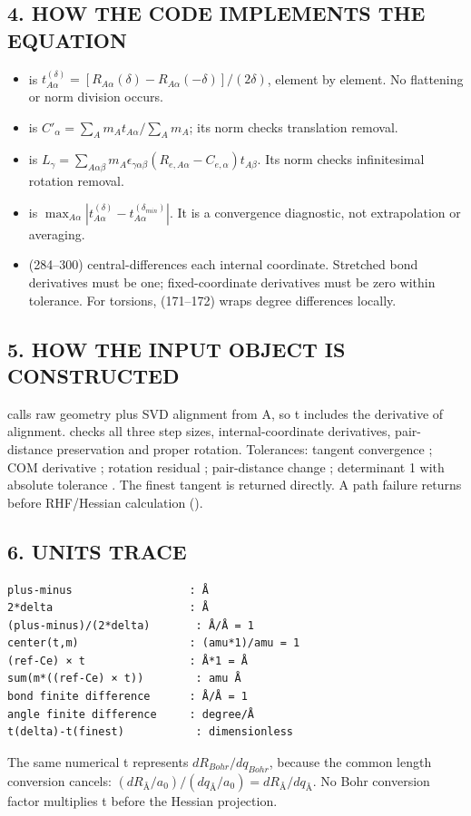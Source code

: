 \documentclass[10pt,a4paper]{article}
\begin{document}
\subsection{4. HOW THE CODE IMPLEMENTS THE EQUATION}
\begin{itemize}
\item {} is \(t^{(δ)}_{A\alpha}=[R_{A\alpha}(δ)-R_{A\alpha}(-δ)]/(2δ)\), element by element. No flattening or norm division occurs.
\item {} is \(C'_\alpha=\sum_A m_At_{A\alpha}/\sum_A m_A\); its norm checks translation removal.
\item {} is \(L_\gamma=\sum_{A\alpha\beta}m_A\epsilon_{\gamma\alpha\beta}(R_{e,A\alpha}-C_{e,\alpha})t_{A\beta}\). Its norm checks infinitesimal rotation removal.
\item {} is \(\max_{A\alpha}|t^{(δ)}_{A\alpha}-t^{(δ_{min})}_{A\alpha}|\). It is a convergence diagnostic, not extrapolation or averaging.
\item {} (284–300) central-differences each internal coordinate. Stretched bond derivatives must be one; fixed-coordinate derivatives must be zero within tolerance. For torsions,  (171–172) wraps degree differences locally.
\end{itemize}
\subsection{5. HOW THE INPUT OBJECT IS CONSTRUCTED}
 calls raw geometry plus SVD alignment from A, so t includes the derivative of alignment.  checks all three step sizes, internal-coordinate derivatives, pair-distance preservation and proper rotation. Tolerances: tangent convergence ; COM derivative ; rotation residual ; pair-distance change ; determinant 1 with absolute tolerance . The finest tangent is returned directly. A path failure returns  before RHF/Hessian calculation ().

\subsection{6. UNITS TRACE}
\begin{Verbatim}
plus-minus                  : Å
2*delta                     : Å
(plus-minus)/(2*delta)       : Å/Å = 1
center(t,m)                 : (amu*1)/amu = 1
(ref-Ce) × t                : Å*1 = Å
sum(m*((ref-Ce) × t))        : amu Å
bond finite difference      : Å/Å = 1
angle finite difference     : degree/Å
t(delta)-t(finest)           : dimensionless
\end{Verbatim}
The same numerical t represents \(dR_{Bohr}/dq_{Bohr}\), because the common length conversion cancels: \((dR_\text{Å}/a_0)/(dq_\text{Å}/a_0)=dR_\text{Å}/dq_\text{Å}\). No Bohr conversion factor multiplies t before the Hessian projection.
\end{document}
